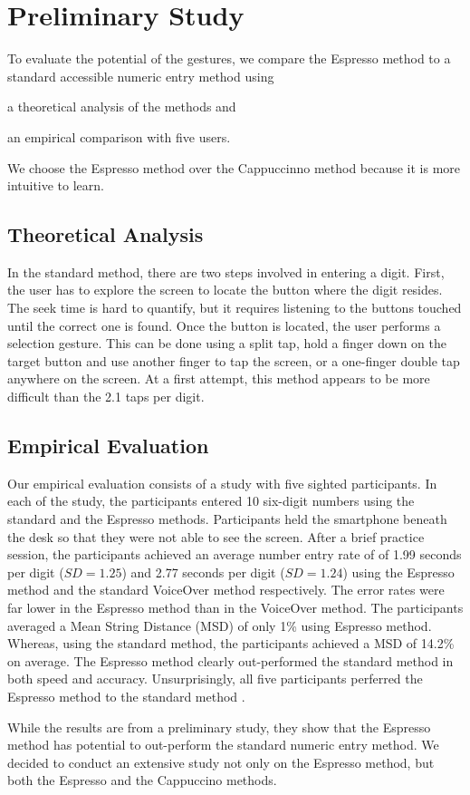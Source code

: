 \section{Preliminary Study}
\label{sec:tapulator}

To evaluate the potential of the gestures, we compare the Espresso method to a standard accessible numeric entry method using 
  \begin{enumerate*}[(1) ]
    \item a theoretical analysis of the methods and 
    \item an empirical comparison with five users. 
  \end{enumerate*}
We choose the Espresso method over the Cappuccinno method because it is more intuitive to learn.

\subsection{Theoretical Analysis}
In the standard method, there are two steps involved in entering a digit. First, the user has to explore the screen to locate the button where the digit resides. The seek time is hard to quantify, but it requires listening to the buttons touched until the correct one is found. Once the button is located, the user performs a selection gesture. This can be done using a split tap, hold a finger down on the target button and use another finger to tap the screen, or a one-finger double tap anywhere on the screen. At a first attempt, this method appears to be more difficult than the 2.1 taps per digit.

\subsection{Empirical Evaluation}
Our empirical evaluation consists of a study with five sighted participants. In each of the study, the participants entered 10 six-digit numbers using the standard and the Espresso methods. Participants held the smartphone beneath the desk so that they were not able to see the screen. After a brief practice session, the participants achieved an average number entry rate of of 1.99 seconds per digit ($SD = 1.25$) and 2.77 seconds per digit ($SD = 1.24$) using the Espresso method and the standard VoiceOver method respectively. The error rates were far lower in the Espresso method than in the VoiceOver method. The participants averaged a Mean String Distance (MSD) of only 1\% using Espresso method. Whereas, using the standard method, the participants achieved a MSD of 14.2\% on average. The Espresso method clearly out-performed the standard method in both speed and accuracy. Unsurprisingly, all five participants perferred the Espresso method to the standard method \cite{Ruamviboonsuk:2012}.
\par
While the results are from a preliminary study, they show that the Espresso method has potential to out-perform the standard numeric entry method. We decided to conduct an extensive study not only on the Espresso method, but both the Espresso and the Cappuccino methods.